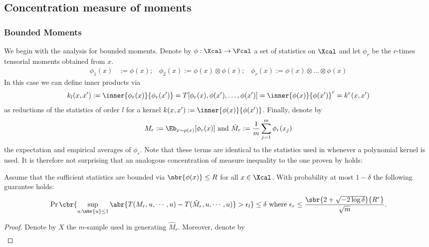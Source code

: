 \documentclass[twoside,11pt]{article}
\begin{document}
{\subsection{Concentration measure of moments}
\subsubsection{Bounded Moments}
We begin with the analysis for bounded moments. Denote by $\phi: \Xcal
\to \Fcal$ a set of statistics on $\Xcal$ and let $\phi_r$ be the
$r$-times tensorial moments obtained from $x$. 
\begin{align}
  \phi_1(x) & := \phi(x);  \; \;\;  \phi_2(x) := \phi(x) \otimes
  \phi(x); \; \;\;  \phi_r(x) := \phi(x) \otimes \ldots \otimes \phi(x)
\end{align}
In this case we can define inner
products via 
\begin{align*}
  k_l(x,x') := \inner{\phi_r(x)}{\phi_r(x')} = 
  T[\phi_r(x), \phi(x'), \ldots, \phi(x')] = 
  \inner{\phi(x)}{\phi(x')}^r = k^r(x,x')
\end{align*}  
as reductions of the statistics of order $l$ for a kernel $k(x,x') :=
\inner{\phi(x)}{\phi(x')}$. Finally, denote by
\begin{align}
  \label{eq:mi-general2}
  M_r := \Eb_{x \sim p(x)}[\phi_r(x)]
  \text{ and }
  \hat{M}_r := \frac{1}{m} \sum_{j=1}^m \phi_r(x_j)
\end{align}
the expectation and empirical averages of $\phi_r$. Note that these
terms are identical to the statistics used in
\cite{GreBorRasSchetal12} whenever a polynomial kernel is used. It is
therefore not surprising that an analogous concentration of measure
inequality to the one proven by \cite{AltSmo06} holds:
\begin{theorem}
\label{th:momentbounds}
Assume that the sufficient statistics are bounded via $\nbr{\phi(x)}
\leq R$ for all $x \in \Xcal$. With probability at most $1 - \delta$
the following guarantee holds: 
  \begin{align}
    \nonumber
    \Pr\cbr{\sup_{u: \nbr{u} \leq 1} \abr{ T(M_r, u,\cdots, u) -T(\hat{M}_r, u, \cdots, u)} > \epsilon_l} \leq \delta
    \text{ where }
    \epsilon_r \leq \frac{\sbr{2 + \sqrt{-2\log\delta}}{R^r}}{\sqrt{m}}.
  \end{align}
\end{theorem}
\begin{proof}
Denote by $X$ the $m$-sample used in generating $\hat{M}_r$. Moreover,
denote by
\begin{align}

\end{align}
\end{proof}}
\end{document}
